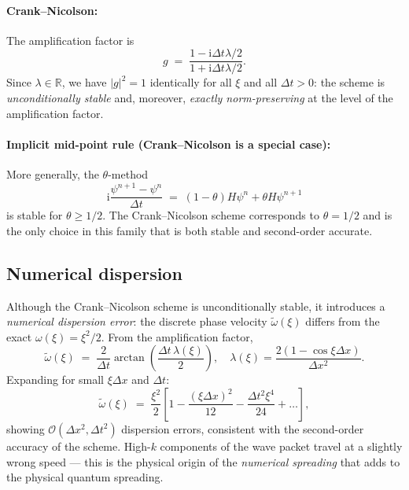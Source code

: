 \documentclass[12pt, a4paper]{article}
\newcommand{\dt}{\Delta t}
\newcommand{\dx}{\Delta x}
\newcommand{\ii}{\mathrm{i}}          %
\newcommand{\CN}{Crank--Nicolson}
\begin{document}
\paragraph{Crank--Nicolson:}
The amplification factor is
\begin{equation}
  g \;=\; \frac{1 - \ii\dt\lambda/2}{1 + \ii\dt\lambda/2}.
\end{equation}
Since $\lambda \in \mathbb{R}$, we have $|g|^2 = 1$ identically for
all $\xi$ and all $\dt > 0$: the scheme is \emph{unconditionally
stable} and, moreover, \emph{exactly norm-preserving} at the level of
the amplification factor.

\paragraph{Implicit mid-point rule (Crank--Nicolson is a special case):}
More generally, the $\theta$-method
\begin{equation}
  \ii\frac{\psi^{n+1}-\psi^n}{\dt} \;=\;
  (1-\theta)H\psi^n + \theta H\psi^{n+1}
\end{equation}
is stable for $\theta \geq 1/2$.  The Crank--Nicolson scheme
corresponds to $\theta = 1/2$ and is the only choice in this family
that is both stable and second-order accurate.

\subsection{Numerical dispersion}

Although the \CN{} scheme is unconditionally stable, it introduces
a \emph{numerical dispersion error}: the discrete phase velocity
$\tilde{\omega}(\xi)$ differs from the exact $\omega(\xi) = \xi^2/2$.
From the amplification factor,
\begin{equation}
  \tilde{\omega}(\xi) \;=\;
  \frac{2}{\dt}\arctan\!\left(\frac{\dt\,\lambda(\xi)}{2}\right),
  \quad
  \lambda(\xi) = \frac{2(1-\cos\xi\dx)}{\dx^2}.
\end{equation}
Expanding for small $\xi\dx$ and $\dt$:
\begin{equation}
  \tilde{\omega}(\xi) \;=\; \frac{\xi^2}{2}
  \left[1 - \frac{(\xi\dx)^2}{12} - \frac{\dt^2\xi^4}{24} + \ldots\right],
\end{equation}
showing $\mathcal{O}(\dx^2, \dt^2)$ dispersion errors, consistent with
the second-order accuracy of the scheme.  High-$k$ components of the
wave packet travel at a slightly wrong speed — this is the physical
origin of the \emph{numerical spreading} that adds to the physical
quantum spreading.
\end{document}
